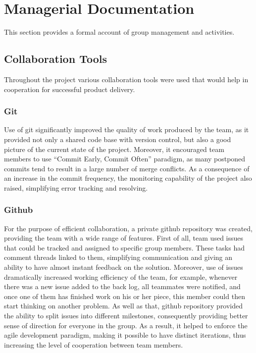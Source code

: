 \documentclass[10pt]{article}
\begin{document}
\clearpage

\section{Managerial Documentation}
\label{sec-group}

This section provides a formal account of group management and activities.

\subsection{Collaboration Tools}

Throughout the project various collaboration tools were used that would help in cooperation for successful product delivery.

\subsubsection{Git}

Use of git significantly improved the quality of work produced by the team, as it provided not only a shared code base with version control, but also a good picture of the current state of the project. Moreover, it encouraged team members to use ``Commit Early, Commit Often'' paradigm, as many postponed commits tend to result in a large number of merge conflicts. As a consequence of an increase in the commit frequency, the monitoring capability of the project also raised, simplifying error tracking and resolving.

\subsubsection{Github}

For the purpose of efficient collaboration, a private github repository was created, providing the team with a wide range of features. First of all, team used issues that could be tracked and assigned to specific group members. These tasks had comment threads linked to them, simplifying communication and giving an ability to have almost instant feedback on the solution. Moreover, use of issues dramatically increased working efficiency of the team, for example, whenever there was a new issue added to the back log, all teammates were notified, and once one of them has finished work on his or her piece, this member could then start thinking on another problem. As well as that, github repository provided the ability to split issues into different milestones, consequently providing better sense of direction for everyone in the group. As a result, it helped to enforce the agile development paradigm, making it possible to have distinct iterations, thus increasing the level of cooperation between team members.
\end{document}
